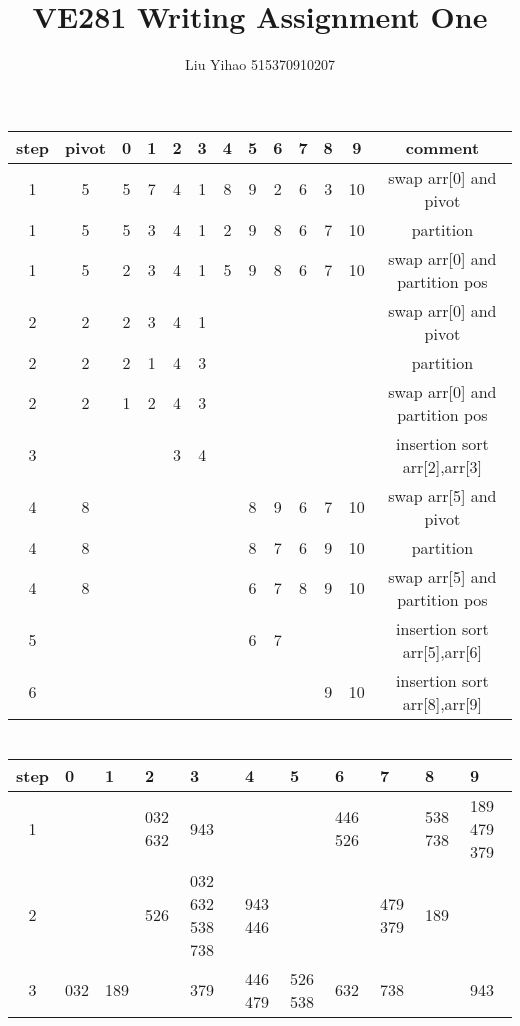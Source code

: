 \documentclass{article}
\title{VE281 Writing Assignment One}
\author{Liu Yihao 515370910207}
\date{}
\begin{document}
\maketitle

\section{}
\begin{center}
\begin{tabular}{|c|c|c|c|c|c|c|c|c|c|c|c|c|}
\hline
step & pivot & 0 & 1 & 2 & 3 & 4 & 5 & 6 & 7 & 8 & 9 & comment \\\hline
1 & 5 & 5 & 7 & 4 & 1 & 8 & 9 & 2 & 6 & 3 & 10 & swap arr[0] and pivot \\\hline
1 & 5 & 5 & 3 & 4 & 1 & 2 & 9 & 8 & 6 & 7 & 10 & partition \\\hline
1 & 5 & 2 & 3 & 4 & 1 & 5 & 9 & 8 & 6 & 7 & 10 & swap arr[0] and partition pos \\\hline
2 & 2 & 2 & 3 & 4 & 1 &&&&&&& swap arr[0] and pivot \\\hline
2 & 2 & 2 & 1 & 4 & 3 &&&&&&& partition \\\hline
2 & 2 & 1 & 2 & 4 & 3 &&&&&&& swap arr[0] and partition pos \\\hline
3 &   &   &   & 3 & 4 &&&&&&& insertion sort arr[2],arr[3] \\\hline
4 & 8 &&&&&& 8 & 9 & 6 & 7 & 10 & swap arr[5] and pivot\\\hline
4 & 8 &&&&&& 8 & 7 & 6 & 9 & 10 & partition \\\hline
4 & 8 &&&&&& 6 & 7 & 8 & 9 & 10 & swap arr[5] and partition pos \\\hline
5 &   &&&&&& 6 & 7 &   &   &    & insertion sort arr[5],arr[6] \\\hline
6 &   &&&&&&   &   &   & 9 & 10 & insertion sort arr[8],arr[9] \\\hline
\end{tabular}
\end{center}

\section{}
\begin{center}
\begin{tabular}{|c|m{2em}<{\centering}|m{2em}<{\centering}|m{2em}<{\centering}|m{2em}<{\centering}|m{2em}<{\centering}|m{2em}<{\centering}|m{2em}<{\centering}|m{2em}<{\centering}|m{2em}<{\centering}|m{2em}<{\centering}|}
\hline
step & 0 & 1 & 2 & 3 & 4 & 5 & 6 & 7 & 8 & 9 \\\hline
1 & & & 032 632 & 943 & & & 446 526 & & 538 738 & 189 479 379 \\\hline 
2 & & & 526 & 032 632 538 738 & 943 446 & & & 479 379 & 189 & \\\hline
3 & 032 & 189 & & 379 & 446 479 & 526 538 & 632 & 738 & & 943\\\hline
\end{tabular}
\end{center}

\section{}
\end{document}

